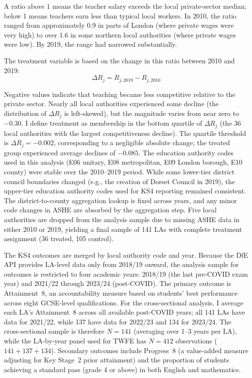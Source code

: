 \documentclass[12pt]{article}
\begin{document}
A ratio above 1 means the teacher salary exceeds the local private-sector median; below 1 means teachers earn less than typical local workers. In 2010, the ratio ranged from approximately 0.9 in parts of London (where private wages were very high) to over 1.6 in some northern local authorities (where private wages were low). By 2019, the range had narrowed substantially.

The treatment variable is based on the change in this ratio between 2010 and 2019:
\begin{equation}
\Delta R_j = R_{j,2019} - R_{j,2010}
\end{equation}

Negative values indicate that teaching became less competitive relative to the private sector. Nearly all local authorities experienced some decline (the distribution of $\Delta R_j$ is left-skewed), but the magnitude varies from near zero to $-0.30$. I define treatment as membership in the bottom quartile of $\Delta R_j$ (the 36 local authorities with the largest competitiveness decline). The quartile threshold is $\Delta R_j = -0.002$, corresponding to a negligible absolute change; the treated group experienced average declines of $-0.085$. The education authority codes used in this analysis (E06 unitary, E08 metropolitan, E09 London borough, E10 county) were stable over the 2010--2019 period. While some lower-tier district council boundaries changed (e.g., the creation of Dorset Council in 2019), the upper-tier education authority codes used for KS4 reporting remained consistent. The district-to-county aggregation lookup is fixed across years, and any minor code changes in ASHE are absorbed by the aggregation step. Five local authorities are dropped from the analysis sample due to missing ASHE data in either 2010 or 2019, yielding a final sample of 141 LAs with complete treatment assignment (36 treated, 105 control).

The KS4 outcomes are merged by local authority code and year. Because the DfE API provides LA-level data only from 2018/19 onward, the analysis sample for outcomes is restricted to four academic years: 2018/19 (the last pre-COVID exam year) and 2021/22 through 2023/24 (post-COVID). The primary outcome is Attainment~8, an accountability measure based on students' best performance across eight GCSE-level qualifications. For the cross-sectional analysis, I average each LA's Attainment~8 across all available post-COVID years; all 141 LAs have data for 2021/22, while 137 have data for 2022/23 and 134 for 2023/24. The cross-sectional sample is therefore $N = 141$ (averaging over 1--3 years per LA), while the LA-by-year panel used for TWFE has $N = 412$ observations ($141 + 137 + 134$). Secondary outcomes include Progress~8 (a value-added measure adjusting for Key Stage~2 prior attainment) and the proportion of students achieving a standard pass (grade 4 or above) in both English and mathematics.
\end{document}
